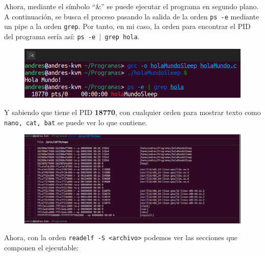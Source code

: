 \documentclass{article}
\begin{document}
Ahora, mediante el símbolo ``\&'' se puede ejecutar el programa en segundo plano. A continuación, se busca el proceso pasando la salida de la orden \verb|ps -e| mediante un pipe a la orden \verb|grep|. Por tanto, en mi caso, la orden para encontrar el PID del programa sería así: \texttt{ps -e $\vert$ grep hola}.

\begin{figure}[H]
    \includegraphics[width=\textwidth]{imagenes/ps.png}
\end{figure}

Y sabiendo que tiene el PID \textbf{18770}, con cualquier orden para mostrar texto como \texttt{nano, cat, bat} se puede ver lo que contiene.

\begin{figure}[H]
    \includegraphics[width=\textwidth]{imagenes/procPID.png}
\end{figure}

Ahora, con la orden \verb|readelf -S <archivo>| podemos ver las secciones que componen el ejecutable:
\end{document}
